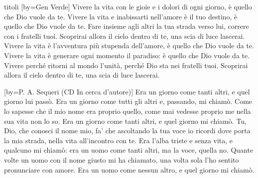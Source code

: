 \begin{songs}{titoli}
[by={Gen Verde}]
\beginverse
Vivere la vita con le gioie e i dolori di ogni giorno,
è quello che Dio vuole da te.
Vivere la vita e inabissarti nell'amore è il tuo destino,
è quello che Dio vuole da te.
Fare insieme agli altri la tua strada verso lui,
correre con i fratelli tuoi.
Scoprirai allora il cielo dentro di te,
una scia di luce lascerai.
\endverse
\beginverse
Vivere la vita è l'avventura più stupenda dell'amore,
è quello che Dio vuole da te.
Vivere la vita è generare ogni momento il paradiso:
è quello che Dio vuole da te.
Vivere perché ritorni al mondo l'unità,
perché Dio sta nei fratelli tuoi.
Scoprirai allora il cielo dentro di te,
una scia di luce lascerai. 
\endverse
\endsong

[by={P. A. Sequeri (CD In cerca d'autore)}]
\beginverse
Era un giorno come tanti altri, e quel giorno lui passò.
Era un giorno come tutti gli altri e, passando, mi chiamò.
Come lo sapesse che il mio nome era proprio quello,
come mai vedesse proprio me nella sua vita non lo so.
Era un giorno come tanti altri, e quel giorno mi chiamò.
\endverse
\beginchorus
Tu, Dio, che conosci il nome mio, fa' che ascoltando la tua voce
io ricordi dove porta la mia strada, nella vita all'incontro con te. 
\endchorus
\beginverse
Era l'alba triste e senza vita, e qualcuno mi chiamò:
era un uomo come tanti altri, ma la voce, quella no.
Quante volte un uomo con il nome giusto mi ha chiamato,
una volta sola l'ho sentito pronunciare con amore.
Era un uomo come nessun altro, e quel giorno mi chiamò.
\endverse
\endsong

\end{songs}
